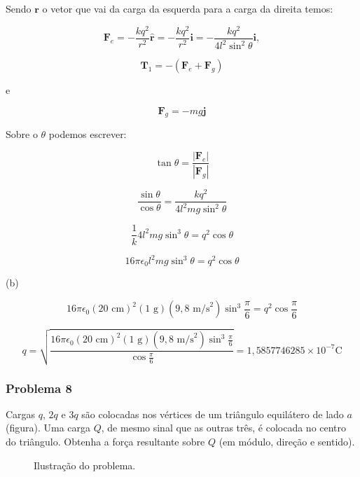 \documentclass[a4paper, 12pt]{article}
\begin{document}
	
	Sendo $\textbf{r}$ o vetor que vai da carga da esquerda para a carga da direita temos:
	
	\[
	\textbf{F}_e=-\frac{kq^2}{r^2}\hat{\textbf{r}}=-\frac{kq^2}{r^2}\textbf{i}=-\frac{kq^2}{4l^2\sin^2\theta}\textbf{i}
	,\]
	
	\[
	\textbf{T}_1=-(\textbf{F}_e+\textbf{F}_g)
	\]
	
	e
	
	\[
	\textbf{F}_g=-mg\textbf{j}
	\]
	
	
	Sobre o $\theta$ podemos escrever:
	
	\[
	\tan\theta=\frac{\left|\textbf{F}_e\right|}{\left|\textbf{F}_g\right|}
	\]
	
	\[
	\frac{\sin\theta}{\cos\theta}=\frac{kq^2}{4l^2mg\sin^2\theta}
	\]
	
	\[
	\frac{1}{k}4l^2mg\sin^3\theta=q^2\cos\theta
	\]
	
	\[
	16\pi\epsilon_0l^2mg\sin^3\theta=q^2\cos\theta
	\]
	
	\par
	(b)
	
	\[
	16\pi\epsilon_0(20\text{ cm})^2(1\text{ g})(9,8\text{ m/s}^2)\sin^3{\frac{\pi}{6}}=q^2\cos\frac{\pi}{6}
	\]
	
	\[
	q=\sqrt{\frac{16\pi\epsilon_0(20\text{ cm})^2(1\text{ g})(9,8\text{ m/s}^2)\sin^3{\frac{\pi}{6}}}{\cos\frac{\pi}{6}}}=1,5857746285 \times 1{0}^{  - 7 }\text{C}
	\]
	
	\subsubsection{Problema 8}
	
	Cargas $q$, $2q$ e $3q$ são colocadas nos vértices de um triângulo equilátero de lado $a$ (figura). Uma carga $Q$, de mesmo sinal que as outras três, é colocada no centro do triângulo. Obtenha a força resultante sobre $Q$ (em módulo, direção e sentido).
	
	\begin{figure}[ht]
		\centering
		\caption{Ilustração do problema.}
	\end{figure}
	
\end{document}
